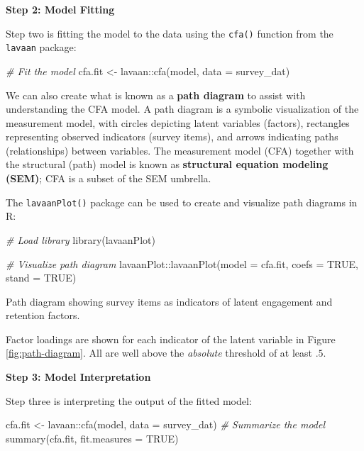 \documentclass[
]{book}
\newenvironment{Shaded}{\begin{snugshade}}{\end{snugshade}}
\newcommand{\AttributeTok}[1]{\textcolor[rgb]{0.77,0.63,0.00}{#1}}
\newcommand{\CommentTok}[1]{\textcolor[rgb]{0.56,0.35,0.01}{\textit{#1}}}
\newcommand{\ConstantTok}[1]{\textcolor[rgb]{0.00,0.00,0.00}{#1}}
\newcommand{\FunctionTok}[1]{\textcolor[rgb]{0.00,0.00,0.00}{#1}}
\newcommand{\NormalTok}[1]{#1}
\newcommand{\OtherTok}[1]{\textcolor[rgb]{0.56,0.35,0.01}{#1}}
\newcommand{\SpecialCharTok}[1]{\textcolor[rgb]{0.00,0.00,0.00}{#1}}
\begin{document}
\textbf{Step 2: Model Fitting}

Step two is fitting the model to the data using the \texttt{cfa()} function from the \texttt{lavaan} package:

\begin{Shaded}
\begin{Highlighting}[]
\CommentTok{\# Fit the model}
\NormalTok{cfa.fit }\OtherTok{\textless{}{-}}\NormalTok{ lavaan}\SpecialCharTok{::}\FunctionTok{cfa}\NormalTok{(model, }\AttributeTok{data =}\NormalTok{ survey\_dat)}
\end{Highlighting}
\end{Shaded}

We can also create what is known as a \textbf{path diagram} to assist with understanding the CFA model. A path diagram is a symbolic visualization of the measurement model, with circles depicting latent variables (factors), rectangles representing observed indicators (survey items), and arrows indicating paths (relationships) between variables. The measurement model (CFA) together with the structural (path) model is known as \textbf{structural equation modeling (SEM)}; CFA is a subset of the SEM umbrella.

The \texttt{lavaanPlot()} package can be used to create and visualize path diagrams in R:

\begin{Shaded}
\begin{Highlighting}[]
\CommentTok{\# Load library}
\FunctionTok{library}\NormalTok{(lavaanPlot)}

\CommentTok{\# Visualize path diagram}
\NormalTok{lavaanPlot}\SpecialCharTok{::}\FunctionTok{lavaanPlot}\NormalTok{(}\AttributeTok{model =}\NormalTok{ cfa.fit, }\AttributeTok{coefs =} \ConstantTok{TRUE}\NormalTok{, }\AttributeTok{stand =} \ConstantTok{TRUE}\NormalTok{)}
\end{Highlighting}
\end{Shaded}

\label{fig:path-diagram}Path diagram showing survey items as indicators of latent engagement and retention factors.

Factor loadings are shown for each indicator of the latent variable in Figure \ref{fig:path-diagram}. All are well above the \emph{absolute} threshold of at least \(.5\).

\textbf{Step 3: Model Interpretation}

Step three is interpreting the output of the fitted model:

\begin{Shaded}
\begin{Highlighting}[]
\NormalTok{cfa.fit }\OtherTok{\textless{}{-}}\NormalTok{ lavaan}\SpecialCharTok{::}\FunctionTok{cfa}\NormalTok{(model, }\AttributeTok{data =}\NormalTok{ survey\_dat)}
\CommentTok{\# Summarize the model}
\FunctionTok{summary}\NormalTok{(cfa.fit, }\AttributeTok{fit.measures =} \ConstantTok{TRUE}\NormalTok{)}
\end{Highlighting}
\end{Shaded}
\end{document}
